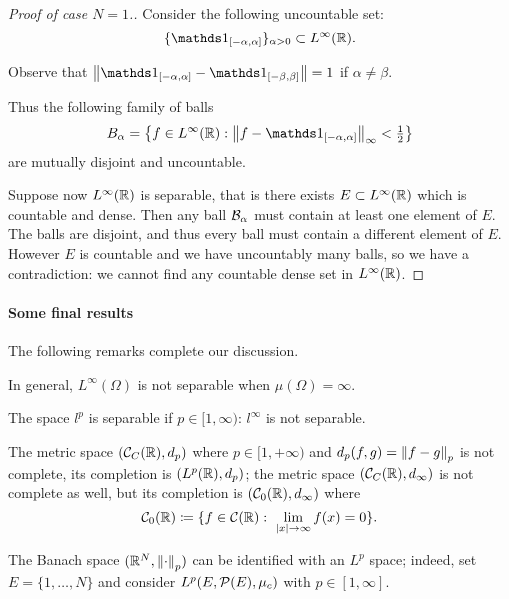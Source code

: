 \begin{proof}[Proof of case $N=1$.]
	Consider the following uncountable set:
	$$\{\Ind_{[-\alpha,\alpha]}\}_{\alpha > 0} \subset L^\infty(\RR).$$
	
	Observe that $\norm{\Ind_{[-\alpha,\alpha]} - \Ind_{[-\beta,\beta]}} = 1$ if $\alpha \neq \beta$.
	
	Thus the following family of balls
	$$B_{\alpha} = \left\{ f\in L^\infty(\RR) : \norm{f-\Ind_{[-\alpha,\alpha]}}_\infty < \tfrac 1 2 \right\}$$
	are mutually disjoint and uncountable.
	
	Suppose now $L^\infty(\mathbb R)$ is separable, that is there exists $E \subset L^\infty(\mathbb R)$ which is countable and dense. Then any ball $\mathcal B_{\alpha}$ must contain at least one element of $E$. The balls are disjoint, and thus every ball must contain a different element of $E$. However $E$ is countable and we have uncountably many balls, so we have a contradiction: we cannot find any countable dense set in $L^\infty(\mathbb R)$.
\end{proof}

\paragraph{Some final results} The following remarks complete our discussion.

In general, $L^\infty(\Omega)$ is not separable when $\mu(\Omega) = \infty$.

The space $l^p$ is separable if $p\in [1,\infty)$: $l^\infty$ is not separable.

The metric space $(\mathcal C_C(\mathbb R),d_p)$ where $p\in [1,+\infty)$ and $d_p(f,g) = \left\lVert f-g\right\rVert_p$ is not complete, its completion is $(L^p(\mathbb R), d_p)$; the metric space $(\mathcal C_C(\mathbb R), d_\infty)$ is not complete as well, but its completion is $(\mathcal C_0(\mathbb R), d_\infty)$ where $$\Cc_0(\RR) \coloneqq \{f \in \Cc(\RR): \ \lim\limits_{|x| \to \infty} f(x) = 0\}.$$ 

The Banach space $(\mathbb R^N, \left\lVert\cdot\right\rVert_p)$ can be identified with an $L^p$ space; indeed, set $E=\{1, \ldots, N\}$ and consider $L^p(E, \mathcal P(E), \mu_c)$ with $p \in [1,\infty]$.